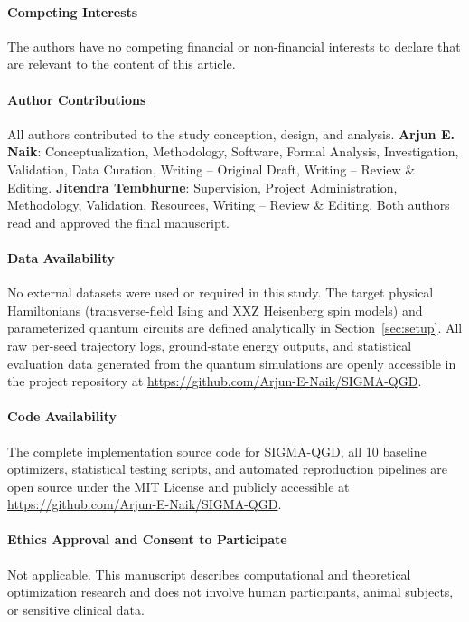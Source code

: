 \documentclass[sn-mathphys,Numbered]{sn-jnl}
\theoremstyle{thmstyleone}
\theoremstyle{thmstyletwo}
\theoremstyle{thmstylethree}
\begin{document}
\paragraph{Competing Interests}
The authors have no competing financial or non-financial interests to declare that are relevant to the content of this article.

\paragraph{Author Contributions}
All authors contributed to the study conception, design, and analysis.
\textbf{Arjun E. Naik}: Conceptualization, Methodology, Software, Formal Analysis, Investigation, Validation, Data Curation, Writing -- Original Draft, Writing -- Review \& Editing.
\textbf{Jitendra Tembhurne}: Supervision, Project Administration, Methodology, Validation, Resources, Writing -- Review \& Editing.
Both authors read and approved the final manuscript.

\paragraph{Data Availability}
No external datasets were used or required in this study. The target physical Hamiltonians (transverse-field Ising and XXZ Heisenberg spin models) and parameterized quantum circuits are defined analytically in Section~\ref{sec:setup}. All raw per-seed trajectory logs, ground-state energy outputs, and statistical evaluation data generated from the quantum simulations are openly accessible in the project repository at \url{https://github.com/Arjun-E-Naik/SIGMA-QGD}.

\paragraph{Code Availability}
The complete implementation source code for SIGMA-QGD, all 10 baseline optimizers, statistical testing scripts, and automated reproduction pipelines are open source under the MIT License and publicly accessible at \url{https://github.com/Arjun-E-Naik/SIGMA-QGD}.

\paragraph{Ethics Approval and Consent to Participate}
Not applicable. This manuscript describes computational and theoretical optimization research and does not involve human participants, animal subjects, or sensitive clinical data.
\end{document}
